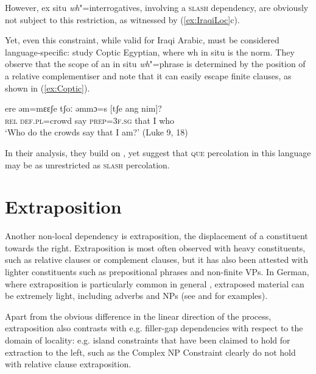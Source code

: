 \documentclass[output=paper
                ,modfonts
                ,nonflat
	        ,collection
	        ,collectionchapter
	        ,collectiontoclongg
 	        ,biblatex
                ,babelshorthands
                ,newtxmath
                ,draftmode
                ,colorlinks, citecolor=brown
]{./langsci/langscibook}
\begin{document}
{\begin{exe}
\end{exe}

\noindent
However, ex situ \emph{wh}"=interrogatives, involving a \textsc{slash} dependency, are obviously not subject to this restriction, as witnessed by (\ref{ex:IraqiLoc}c).  

Yet, even this constraint, while valid for Iraqi Arabic, must be considered language-specific: \citet{Crysmann:Reintges:14} study Coptic Egyptian, where wh in situ is the norm. They observe that the scope of an in situ \emph{wh}"=phrase is determined by the position of a relative complementiser and note that it can easily escape finite clauses, as shown in (\ref{ex:Coptic}). 

\begin{exe}
  \ex \gll ere əm=mɛɛʃe tʃoː əmmɔ=s [tʃe ang nim]?\\
  \textsc{rel} \textsc{def.pl}=crowd say \textsc{prep=3f.sg} \spacebr{}that I who\\
  \glt `Who do the crowds say that I am?'  (Luke 9, 18) \label{ex:Coptic}
\end{exe}

\noindent
In their analysis, they build on \citet{Johnson:Lappin:97}, yet suggest that \textsc{que} percolation in this language may be as unrestricted as \textsc{slash} percolation.


\section{Extraposition}

Another non-local dependency is extraposition, the displacement of a
constituent towards the right. Extraposition is most often observed
with heavy constituents, such as relative clauses or complement
clauses, but it has also been attested with lighter
constituents such as prepositional phrases and non-finite VPs. In
German, where extraposition is particularly common
in general \citep{uszkoreit:etal:98}, extraposed material can be extremely light,
including adverbs and NPs (see  and  for examples).



Apart from the obvious difference in the linear direction of the
process, extraposition also contrasts with e.g. filler-gap
dependencies with respect to the domain of locality: e.g. island
constraints that have been claimed to hold for extraction to the left,
such as the Complex NP Constraint \citep{ross_j67} clearly do not hold with relative clause
extraposition.

}
\end{document}

